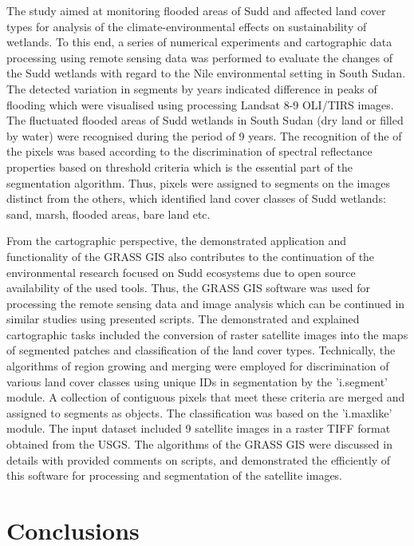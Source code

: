 \documentclass[analytics,article,submit,pdftex,moreauthors]{Definitions/mdpi}
\begin{document}
The study aimed at monitoring flooded areas of Sudd and affected land cover types for analysis of the climate-environmental effects on sustainability of wetlands. To this end, a series of numerical experiments and cartographic data processing using remote sensing data was performed to evaluate the changes of the Sudd wetlands with regard to the Nile environmental setting in South Sudan. The detected variation in segments by years indicated difference in peaks of flooding which were visualised using processing Landsat 8-9 OLI/TIRS images. The fluctuated flooded areas of Sudd wetlands in South Sudan (dry land or filled by water) were recognised during the period of 9 years. The recognition of the of the pixels was based according to the discrimination of spectral reflectance properties based on threshold criteria which is the essential part of the segmentation algorithm. Thus, pixels were assigned to segments on the images distinct from the others, which identified land cover classes of Sudd wetlands: sand, marsh, flooded areas, bare land etc.

From the cartographic perspective, the demonstrated application and functionality of the GRASS GIS also contributes to the continuation of the environmental research focused on Sudd ecosystems due to open source availability of the used tools. Thus, the GRASS GIS software was used for processing the remote sensing data and image analysis which can be continued in similar studies using presented scripts. The demonstrated and explained cartographic tasks included the conversion of raster satellite images into the maps of segmented patches and classification of the land cover types. Technically, the algorithms of region growing and merging were employed for discrimination of various land cover classes using unique IDs in segmentation by the 'i.segment' module. A collection of contiguous pixels that meet these criteria are merged and assigned to segments as objects. The classification was based on the 'i.maxlike' module. The input dataset included 9 satellite images in a raster TIFF format obtained from the USGS. The algorithms of the GRASS GIS were discussed in details with provided comments on scripts, and demonstrated the efficiently of this software for processing and segmentation of the satellite images.

\section{Conclusions}
\end{document}
